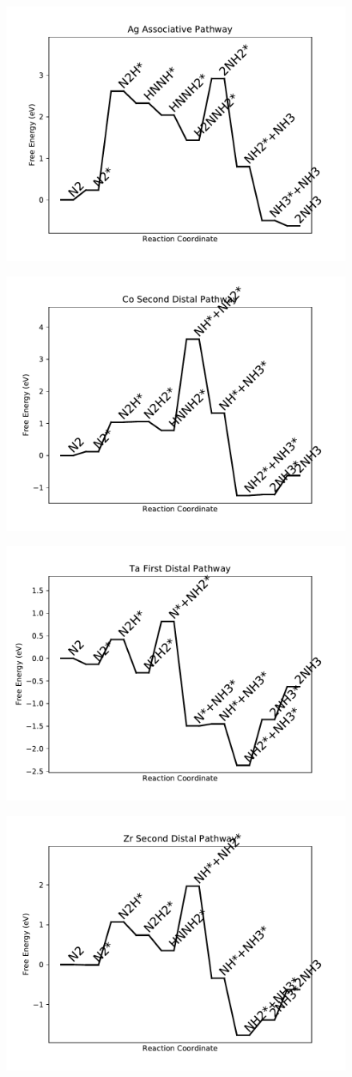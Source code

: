 \begin{figure}
\includegraphics[width=0.5\linewidth]{data/plots/Ag_associative.pdf}
\label{fig:Ag_associative}
\end{figure}

\begin{figure}
\includegraphics[width=0.5\linewidth]{data/plots/Co_distal_2.pdf}
\label{fig:Co_distal_2}
\end{figure}

\begin{figure}
\includegraphics[width=0.5\linewidth]{data/plots/Ta_distal_1.pdf}
\label{fig:Ta_distal_1}
\end{figure}

\begin{figure}
\includegraphics[width=0.5\linewidth]{data/plots/Zr_distal_2.pdf}
\label{fig:Zr_distal_2}
\end{figure}

